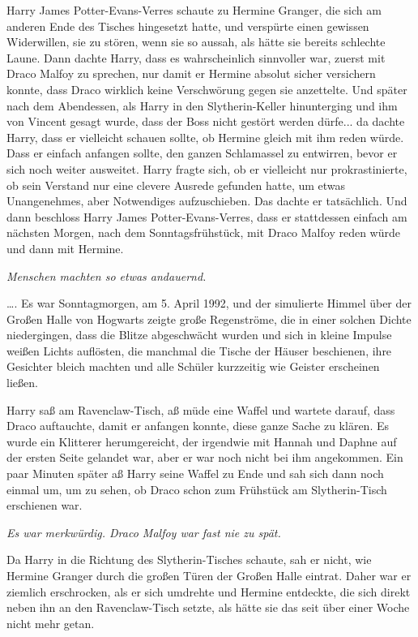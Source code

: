Harry James Potter-Evans-Verres schaute zu Hermine Granger, die sich am anderen
Ende des Tisches hingesetzt hatte, und verspürte einen gewissen Widerwillen, sie
zu stören, wenn sie so aussah, als hätte sie bereits schlechte Laune. Dann
dachte Harry, dass es wahrscheinlich sinnvoller war, zuerst mit Draco Malfoy zu
sprechen, nur damit er Hermine absolut sicher versichern konnte, dass Draco
wirklich keine Verschwörung gegen sie anzettelte. Und später nach dem
Abendessen, als Harry in den Slytherin-Keller hinunterging und ihm von Vincent
gesagt wurde, dass der Boss nicht gestört werden dürfe... da dachte Harry, dass
er vielleicht schauen sollte, ob Hermine gleich mit ihm reden würde. Dass er
einfach anfangen sollte, den ganzen Schlamassel zu entwirren, bevor er sich noch
weiter ausweitet. Harry fragte sich, ob er vielleicht nur prokrastinierte, ob
sein Verstand nur eine clevere Ausrede gefunden hatte, um etwas Unangenehmes,
aber Notwendiges aufzuschieben. Das dachte er tatsächlich. Und dann beschloss
Harry James Potter-Evans-Verres, dass er stattdessen einfach am nächsten Morgen,
nach dem Sonntagsfrühstück, mit Draco Malfoy reden würde und dann mit Hermine.

\emph{Menschen machten so etwas andauernd.}

…. Es war Sonntagmorgen, am 5. April 1992, und der simulierte Himmel über der
Großen Halle von Hogwarts zeigte große Regenströme, die in einer solchen Dichte
niedergingen, dass die Blitze abgeschwächt wurden und sich in kleine Impulse
weißen Lichts auflösten, die manchmal die Tische der Häuser beschienen, ihre
Gesichter bleich machten und alle Schüler kurzzeitig wie Geister erscheinen
ließen.

Harry saß am Ravenclaw-Tisch, aß müde eine Waffel und wartete darauf, dass Draco
auftauchte, damit er anfangen konnte, diese ganze Sache zu klären. Es wurde ein
Klitterer herumgereicht, der irgendwie mit Hannah und Daphne auf der ersten
Seite gelandet war, aber er war noch nicht bei ihm angekommen. Ein paar Minuten
später aß Harry seine Waffel zu Ende und sah sich dann noch einmal um, um zu
sehen, ob Draco schon zum Frühstück am Slytherin-Tisch erschienen war.

\emph{Es war merkwürdig. Draco Malfoy war fast nie zu spät.}

Da Harry in die Richtung des Slytherin-Tisches schaute, sah er nicht, wie
Hermine Granger durch die großen Türen der Großen Halle eintrat. Daher war er
ziemlich erschrocken, als er sich umdrehte und Hermine entdeckte, die sich
direkt neben ihn an den Ravenclaw-Tisch setzte, als hätte sie das seit über
einer Woche nicht mehr getan.

